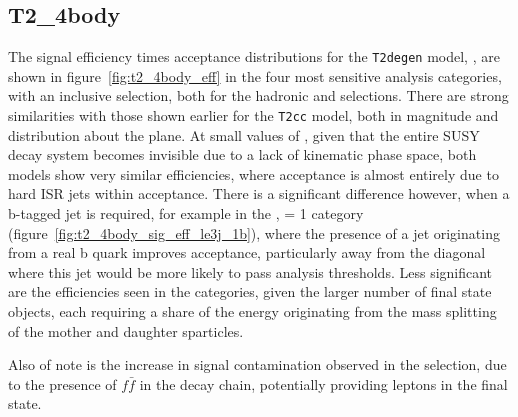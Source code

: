 
\subsection{T2\_4body}
\label{sec:t2degen_eff}

The signal efficiency times acceptance distributions for the \texttt{T2degen} model,
\Ttwodegen, are shown 
in figure~\ref{fig:t2_4body_eff} in the four most sensitive analysis categories,
with an inclusive \HT selection, both for the hadronic and \mj selections. There
are strong similarities with those shown earlier for the \texttt{T2cc} model, 
both in magnitude and distribution about the plane. At small values of \deltam, 
given that the entire SUSY decay system becomes invisible due to a lack of 
kinematic phase space, both models show very similar efficiencies, where 
acceptance is almost entirely due to hard ISR jets within acceptance. There is a
significant difference however, when a b-tagged jet is required, for example in 
the \njlow, \nb= 1 category (figure~\ref{fig:t2_4body_sig_eff_le3j_1b}), where
the presence of a jet originating from a real 
b quark improves acceptance, particularly away from the diagonal where this jet 
would be more likely to pass analysis thresholds. Less significant are the 
efficiencies seen in the \njhigh categories, given the larger number of final 
state objects, each requiring a share of the energy originating from the mass 
splitting of the mother and daughter sparticles.

Also of note is the increase in signal contamination observed in the \mj 
selection, due to the presence of $f\bar{f}$ in the decay chain, potentially 
providing leptons in the final state.

